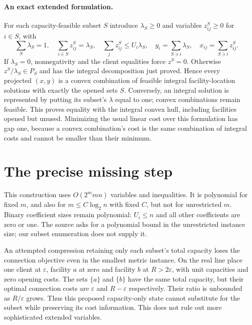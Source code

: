 \documentclass[11pt]{article}
\begin{document}
\paragraph{An exact extended formulation.}
For each capacity-feasible subset $S$ introduce $\lambda_S\ge0$ and variables
$z^S_{ij}\ge0$ for $i\in S$, with
\[
\sum_S\lambda_S=1,\quad
\sum_{i\in S}z^S_{ij}=\lambda_S,\quad
\sum_j z^S_{ij}\le U_i\lambda_S,\quad
 y_i=\sum_{S\ni i}\lambda_S,\quad x_{ij}=\sum_{S\ni i}z^S_{ij}.
\]
If $\lambda_S=0$, nonnegativity and the client equalities force $z^S=0$.
Otherwise $z^S/\lambda_S\in P_S$ and has the integral decomposition just
proved. Hence every projected $(x,y)$ is a convex combination of feasible
integral facility-location solutions with exactly the opened sets $S$.
Conversely, an integral solution is represented by putting its subset's
$\lambda$ equal to one; convex combinations remain feasible.
This proves equality with the integral convex hull, including facilities
opened but unused. Minimizing the usual linear cost over this formulation
has gap one, because a convex combination's cost is the same combination
of integral costs and cannot be smaller than their minimum.

\section{The precise missing step}
This construction uses $O(2^m mn)$ variables and inequalities. It is polynomial
for fixed $m$, and also for $m\le C\log_2 n$ with fixed $C$, but not for
unrestricted $m$. Binary coefficient sizes remain polynomial: $U_i\le n$
and all other coefficients are zero or one. The source asks for a polynomial
bound in the unrestricted instance size; our subset enumeration does not
supply it.

An attempted compression retaining only each subset's total capacity loses
the connection objective even in the smallest metric instance. On the real
line place one client at $\varepsilon$, facility $a$ at zero and facility
$b$ at $R>2\varepsilon$, with unit capacities and zero opening costs.
The sets $\{a\}$ and $\{b\}$ have the same total capacity, but their optimal
connection costs are $\varepsilon$ and $R-\varepsilon$ respectively.
Their ratio is unbounded as $R/\varepsilon$ grows. Thus this proposed
capacity-only state cannot substitute for the subset while preserving its
cost information. This does not rule out more sophisticated extended variables.
\end{document}
